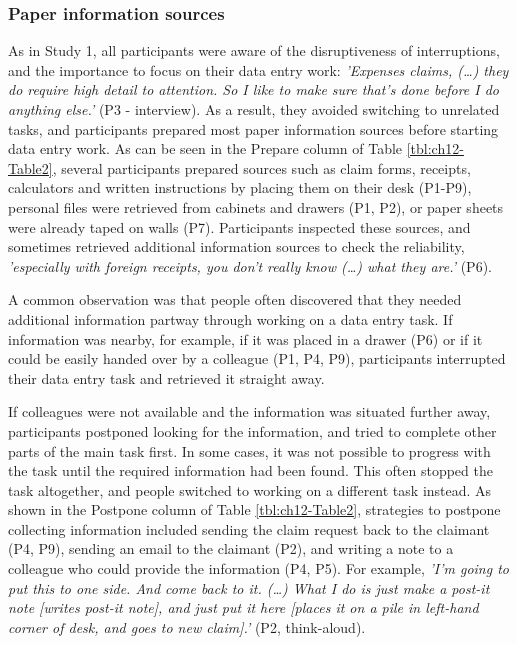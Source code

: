 \subsubsection{Paper information sources}
As in Study 1, all participants were aware of the disruptiveness of interruptions, and the importance to focus on their data entry work: \textit{'Expenses claims, (…) they do require high detail to attention. So I like to make sure that's done before I do anything else.'} (P3 - interview). As a result, they avoided switching to unrelated tasks, and participants prepared most paper information sources before starting data entry work. As can be seen in the Prepare column of Table \ref{tbl:ch12-Table2}, several participants prepared sources such as claim forms, receipts, calculators and written instructions by placing them on their desk (P1-P9), personal files were retrieved from cabinets and drawers (P1, P2), or paper sheets were already taped on walls (P7). Participants inspected these sources, and sometimes retrieved additional information sources to check the reliability, \textit{'especially with foreign receipts, you don't really know (…) what they are.'} (P6). 

A common observation was that people often discovered that they needed additional information partway through working on a data entry task. If information was nearby, for example, if it was placed in a drawer (P6) or if it could be easily handed over by a colleague (P1, P4, P9), participants interrupted their data entry task and retrieved it straight away. 

If colleagues were not available and the information was situated further away, participants postponed looking for the information, and tried to complete other parts of the main task first. In some cases, it was not possible to progress with the task until the required information had been found. This often stopped the task altogether, and people switched to working on a different task instead. As shown in the Postpone column of Table \ref{tbl:ch12-Table2}, strategies to postpone collecting information included sending the claim request back to the claimant (P4, P9), sending an email to the claimant (P2), and writing a note to a colleague who could provide the information (P4, P5). For example, \textit{'I'm going to put this to one side. And come back to it. (…) What I do is just make a post-it note [writes post-it note], and just put it here [places it on a pile in left-hand corner of desk, and goes to new claim].'} (P2, think-aloud). 

